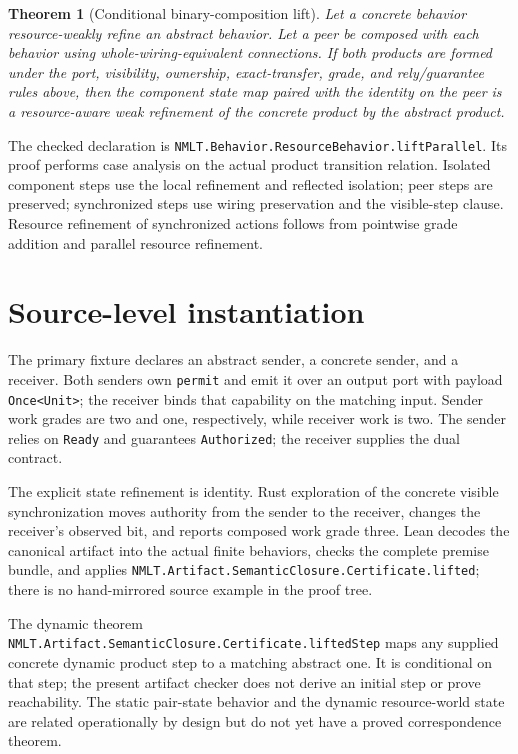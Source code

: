 \documentclass[11pt]{article}
\newtheorem{theorem}{Theorem}
\begin{document}
\begin{theorem}[Conditional binary-composition lift]
Let a concrete behavior resource-weakly refine an abstract behavior.  Let a
peer be composed with each behavior using whole-wiring-equivalent
connections.  If both products are formed under the port, visibility,
ownership, exact-transfer, grade, and rely/guarantee rules above, then the
component state map paired with the identity on the peer is a resource-aware
weak refinement of the concrete product by the abstract product.
\end{theorem}

The checked declaration is
\texttt{NMLT.Behavior.ResourceBehavior.liftParallel}.  Its proof performs case
analysis on the actual product transition relation.  Isolated component steps
use the local refinement and reflected isolation; peer steps are preserved;
synchronized steps use wiring preservation and the visible-step clause.
Resource refinement of synchronized actions follows from pointwise grade
addition and parallel resource refinement.

\section{Source-level instantiation}

The primary fixture declares an abstract sender, a concrete sender, and a
receiver.  Both senders own \texttt{permit} and emit it over an output port
with payload \texttt{Once<Unit>}; the receiver binds that capability on the
matching input.  Sender work grades are two and one, respectively, while
receiver work is two.  The sender relies on \texttt{Ready} and guarantees
\texttt{Authorized}; the receiver supplies the dual contract.

The explicit state refinement is identity.  Rust exploration of the concrete
visible synchronization moves authority from the sender to the receiver,
changes the receiver's observed bit, and reports composed work grade three.
Lean decodes the
  canonical artifact into the actual finite behaviors, checks the complete
  premise bundle, and applies
  \texttt{NMLT.Artifact.SemanticClosure.Certificate.lifted}; there is no
  hand-mirrored source example in the proof tree.

The dynamic theorem
\texttt{NMLT.Artifact.SemanticClosure.Certificate.liftedStep} maps any supplied
concrete dynamic product step to a matching abstract one.  It is conditional on
that step; the present artifact checker does not derive an initial step or prove
reachability.  The static pair-state behavior and the dynamic resource-world
state are related operationally by design but do not yet have a proved
correspondence theorem.
\end{document}

